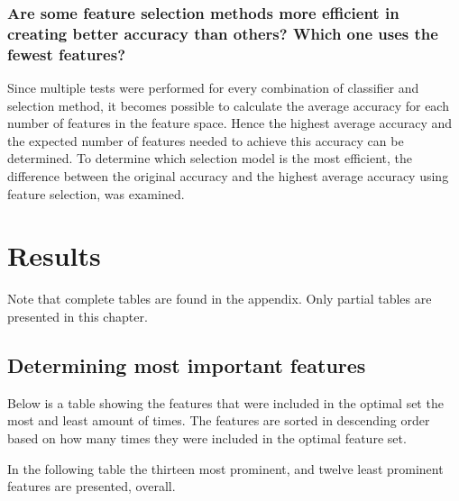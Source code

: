 \documentclass{kththesis}
\begin{document}
\subsection{Are some feature selection methods more efficient in creating better accuracy than others? Which one uses the fewest features?}
Since multiple tests were performed for every combination of classifier and selection method, it becomes possible to calculate the average accuracy for each number of features in the feature space. Hence the highest average accuracy and the expected number of features needed to achieve this accuracy can be determined. To determine which selection model is the most efficient, the difference between the original accuracy and the highest average accuracy using feature selection, was examined.







\chapter{Results}

Note that complete tables are found in the appendix. Only partial tables are presented in this chapter.

\section{Determining most important features}

Below is a table showing the features that were included in the optimal set the most and least amount of times. The features are sorted in descending order based on how many times they were included in the optimal feature set.

In the following table the thirteen most prominent, and twelve least prominent features are presented, overall. 

\end{document}
